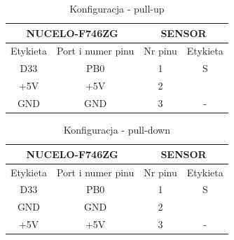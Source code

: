 \documentclass[11pt, a4paper]{article}
\begin{document}
\vspace{0.5cm}
\begin{table}[h!]
    \centering
    \begin{tabular}{|c|c|c|c|} 
        \hline
        \multicolumn{2}{|c|}{NUCELO-F746ZG} & \multicolumn{2}{c|}{SENSOR}  \\ 
        \hline
        Etykieta & Port i numer pinu       & Nr pinu & Etykieta           \\ 
        \hline
        D33      & PB0                     & 1       & S              \\
        +5V      & +5V                      & 2     &   \\
        GND      & GND                       & 3       & -              \\
        \hline
    \end{tabular}
    \caption{Konfiguracja - pull-up}
\end{table}
\vspace{0.5cm}

\vspace{0.5cm}
\begin{table}[h!]
    \centering
    \begin{tabular}{|c|c|c|c|} 
        \hline
        \multicolumn{2}{|c|}{NUCELO-F746ZG} & \multicolumn{2}{c|}{SENSOR}  \\ 
        \hline
        Etykieta & Port i numer pinu       & Nr pinu & Etykieta           \\ 
        \hline
        D33      & PB0                     & 1       & S              \\
        GND      & GND                      & 2     &   \\
        +5V     & +5V                      & 3       & -              \\
        \hline
    \end{tabular}
    \caption{Konfiguracja - pull-down}
\end{table}
\vspace{0.5cm}


\end{document}
